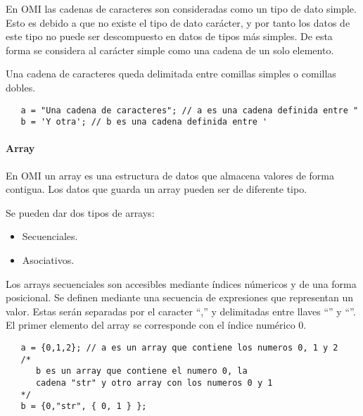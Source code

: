 En OMI las cadenas de caracteres son consideradas como un tipo de dato simple. Esto es debido a que no existe el tipo de dato carácter, y por tanto los datos de este tipo no puede ser 
descompuesto en datos de tipos más simples. De esta forma se considera al carácter simple como una cadena de un solo elemento.

Una cadena de caracteres queda delimitada entre comillas simples o comillas dobles. \\

\begin{lstlisting}
   a = "Una cadena de caracteres"; // a es una cadena definida entre "
   b = 'Y otra'; // b es una cadena definida entre '
\end{lstlisting}


\paragraph{Array}\label{sec:type_array}

En OMI un array es una estructura de datos que almacena valores de forma contigua. Los datos que guarda un array pueden ser de diferente tipo. 

Se pueden dar dos tipos de arrays:

\begin{itemize}
\item Secuenciales.
\item Asociativos.
\end{itemize}

Los arrays secuenciales son accesibles mediante índices númericos y de una forma posicional. Se definen mediante una secuencia de expresiones que representan 
un valor. Estas serán separadas por el caracter ``,'' y delimitadas entre llaves ``{'' y ``}''. El primer elemento del array se corresponde con el índice numérico $0$. \\

 \begin{lstlisting}
   a = {0,1,2}; // a es un array que contiene los numeros 0, 1 y 2
   /* 
      b es un array que contiene el numero 0, la
      cadena "str" y otro array con los numeros 0 y 1
   */
   b = {0,"str", { 0, 1 } }; 
\end{lstlisting}


